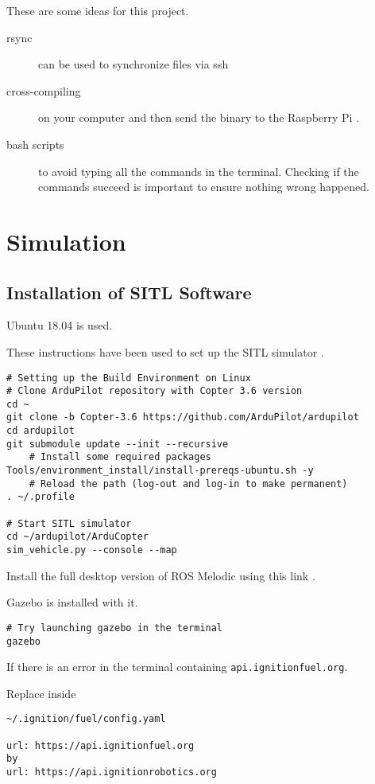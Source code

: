 These are some ideas for this project.
\begin{description}
  \item[rsync] can be used to synchronize files via ssh
  \item[cross-compiling] on your computer and then send the binary to the Raspberry Pi \cite{hackaday_cross_compiling}.
  \item[bash scripts] to avoid typing all the commands in the terminal. Checking if the commands succeed is important to ensure nothing wrong happened. \cite{ryanstutorials_bash_scripting}
\end{description}

\section{Simulation}

\subsection{Installation of SITL Software}
Ubuntu 18.04 is used.

These instructions have been used to set up the SITL simulator \cite{ardupilot_sitl}.

\begin{verbatim}
# Setting up the Build Environment on Linux
# Clone ArduPilot repository with Copter 3.6 version
cd ~
git clone -b Copter-3.6 https://github.com/ArduPilot/ardupilot
cd ardupilot
git submodule update --init --recursive
    # Install some required packages
Tools/environment_install/install-prereqs-ubuntu.sh -y
    # Reload the path (log-out and log-in to make permanent)
. ~/.profile

# Start SITL simulator
cd ~/ardupilot/ArduCopter
sim_vehicle.py --console --map
\end{verbatim}

Install the full desktop version of ROS Melodic using this link \cite{ros_install}.

Gazebo is installed with it.

\begin{verbatim}
# Try launching gazebo in the terminal
gazebo
            \end{verbatim}

If there is an error in the terminal containing \texttt{api.ignitionfuel.org}.

Replace inside
\begin{verbatim}
~/.ignition/fuel/config.yaml

url: https://api.ignitionfuel.org
by
url: https://api.ignitionrobotics.org
\end{verbatim}

